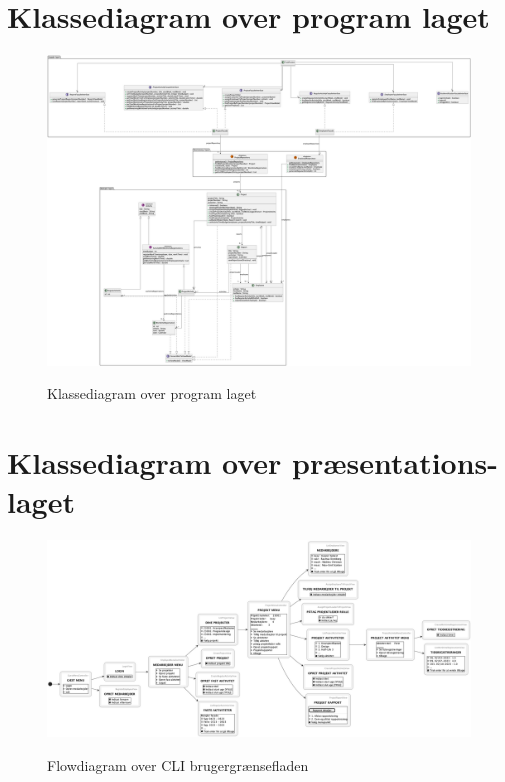 \begin{landscape}
    \section{Klassediagram over program laget}\label{apdx:classDiagram_full}
    \begin{figure}[H]
        \centering
        \caption{Klassediagram over program laget}
        \includegraphics[width = \textheight]{TaskFusion/out/assets/diagrams/class_persistency_full/ClassDiagram_full.png}
        \label{fig:classDiagram_full}
    \end{figure}
    \section{Klassediagram over præsentations-laget}\label{apdx:classDiagram_presentation}
    \begin{figure}[H]
        \centering
        \caption{Flowdiagram over CLI brugergrænsefladen}
        \includegraphics[width = \linewidth]{TaskFusion/out/assets/diagrams/flow_cli/flow_cli.png}
        \label{fig:flow_cli_big}
    \end{figure}

\end{landscape}
